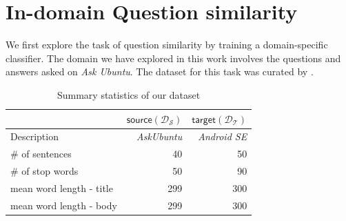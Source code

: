 \documentclass{sigkddExp}
\begin{document}
\section{In-domain Question similarity}
\label{in_domain}
We first explore the task of question similarity by training a domain-specific classifier. The domain we have explored in this work involves the questions and answers asked on \textit{Ask Ubuntu}. The dataset for this task was curated by \cite{lei2015semi}. 

\begin{table}[h]
\begin{tabular}{l|r|r}
     
     & $\mathsf{source} (\mathcal{D_S})$
     & $\mathsf{target} (\mathcal{D_T})$
     \\
     \toprule
     Description
     & \textit{AskUbuntu}
     & \textit{Android SE}
     \\
     \# of sentences
     & 40
     & 50
     \\
     \# of stop words 
     & 50
     & 90
     \\
     mean word length - title
     & 299
     & 300
     \\
     mean word length - body
     & 299
     & 300
\end{tabular}
\caption{Summary statistics of our dataset}
\label{tab:dataset}
\end{table}
\end{document}
